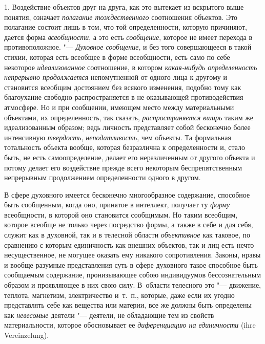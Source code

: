 {{1. Воздействие объектов друг на друга, как это вытекает из
вскрытого выше понятия, означает
{\em полагание тождественного}
соотношения объектов. Это полагание состоит лишь в том, что
той определенности, которую
причиняют,
дается форма
{\em всеобщности}, а это
есть {\em сообщение},
которое не имеет перехода в противоположное. "---
{\em Духовное сообщение},
и без того совершающееся в такой стихии, которая есть
всеобщее в форме всеобщности, есть само по себе некоторое
{\em идеализованное}
соотношение, в котором
{\em какая-нибудь определенность
непрерывно продолжается} непомутненной от одного лица к
другому и становится всеобщим достоянием без всякого изменения, подобно
тому как благоухание свободно распространяется в не оказывающей
противодействия атмосфере. Но и при сообщении, имеющем место между
материальными объектами, их определенность, так сказать,
{\em распространяется вширь}
таким же идеализованным образом; ведь личность представляет
собой бесконечно более интенсивную
{\em твердость},{\em
неподатливость}, чем объекты. Та формальная
тотальность объекта вообще, которая безразлична к определенности и, стало
быть, не есть самоопределение, делает его неразличенным от другого объекта
и потому делает его воздействие прежде всего некоторым беспрепятственным
непрерывным продолжением определенности одного в другом.

В сфере духовного имеется бесконечно многообразное содержание,
способное быть сообщенным, когда оно, принятое в интеллект, получает ту
{\em форму} всеобщности,
в которой оно становится сообщимым. Но таким всеобщим, которое всеобще не
только через посредство формы, а также в себе и для себя, служит как в
духовной, так и в телесной области
{\em объективное} как
таковое, по сравнению с которым единичность как внешних объектов, так и лиц
есть нечто несущественное, не могущее оказать ему никакого сопротивления.
Законы, нравы и вообще разумные представления суть в сфере духовного такое
способное быть сообщаемым содержание, пронизывающее собою индивидуумов
бессознательным образом и проявляющее в них свою силу. В~области телесного
это "--- движение, теплота, магнетизм, электричество и~т.~п.,
которые, даже если их угодно представлять себе как вещества или материи,
все же должны быть определены как
{\em невесомые} деятели
"--- деятели, не обладающие тем из свойств материальности,
которое обосновывает ее
{\em диференциацию на единичности} (ihre Vereinzelung).

}}
